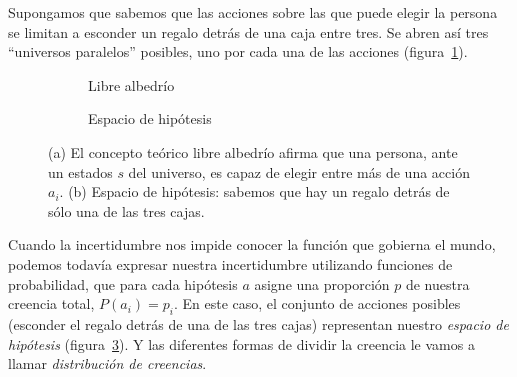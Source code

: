 \documentclass[a4paper,10pt]{book}
\theoremstyle{definition}
\begin{document}
Supongamos que sabemos que las acciones sobre las que puede elegir la persona se limitan a esconder un regalo detr\'as de una caja entre tres.
%
Se abren as\'i tres ``universos paralelos'' posibles, uno por cada una de las acciones (figura~\ref{fig:libre_albedrio}).
%
\begin{figure}[ht!]
\centering
\begin{subfigure}[b]{0.48\textwidth}
\centering
    \caption{Libre albedr\'io}
    \label{fig:libre_albedrio}
\end{subfigure}
\begin{subfigure}[b]{0.48\textwidth}
 \centering
   \caption{Espacio de hip\'otesis}
   \label{fig:espacio_de_hipotesis}
\end{subfigure}
    \caption{(a) El concepto te\'orico libre albedr\'io afirma que una persona, ante un estados $s$ del universo, es capaz de elegir entre m\'as de una acci\'on $a_i$.
    (b) Espacio de hip\'otesis: sabemos que hay un regalo detr\'as de s\'olo una de las tres cajas. }
\end{figure}
%
Cuando la incertidumbre nos impide conocer la funci\'on que gobierna el mundo, podemos todav\'ia expresar nuestra incertidumbre utilizando funciones de probabilidad, que para cada hip\'otesis $a$ asigne una proporci\'on $p$ de nuestra creencia total, $P(a_i) = p_i$.
%
En este caso, el conjunto de acciones posibles (esconder el regalo detr\'as de una de las tres cajas) representan nuestro \emph{espacio de hip\'otesis} (figura~\ref{fig:espacio_de_hipotesis}).
%
Y las diferentes formas de dividir la creencia le vamos a llamar \emph{distribuci\'on de creencias}.
\end{document}
